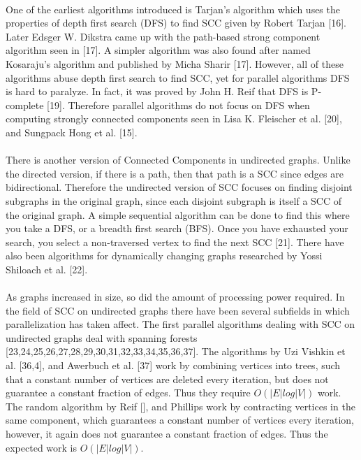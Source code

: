 \documentclass[]{article}
\begin{document}
 
 
 \paragraph{}
 One of the earliest algorithms introduced is Tarjan's algorithm which uses the properties of depth first search (DFS) to find SCC given by Robert Tarjan [16]. Later  Edsger W. Dikstra came up with the path-based strong component algorithm seen in [17]. A simpler algorithm was also found after named Kosaraju's algorithm and published by Micha Sharir [17]. However, all of these algorithms abuse depth first search to find SCC, yet for parallel algorithms DFS is hard to paralyze. In fact, it was proved by John H. Reif that DFS is P-complete [19]. Therefore parallel algorithms do not focus on DFS when computing strongly connected components seen in Lisa K. Fleischer et al. [20], and Sungpack Hong et al. [15].
 
 \paragraph{}
 There is another version of Connected Components in undirected graphs. Unlike the directed version, if there is a path, then that path is a SCC since edges are bidirectional. Therefore the undirected version of SCC focuses on finding disjoint subgraphs in the original graph, since each disjoint subgraph is itself a SCC of the original graph. A simple sequential algorithm can be done to find this where you take a DFS, or a breadth first search (BFS). Once you have exhausted your search, you select a non-traversed vertex to find the next SCC [21]. There have also been algorithms for dynamically changing graphs researched by Yossi Shiloach et al. [22].
 
 \paragraph{}
 As graphs increased in size, so did the amount of processing power required. In the field of SCC on undirected graphs there have been several subfields in which parallelization has taken affect.  The first parallel algorithms dealing with SCC on undirected graphs deal with spanning forests [23,24,25,26,27,28,29,30,31,32,33,34,35,36,37]. The algorithms by Uzi Vishkin et al. [36,4], and Awerbuch et al. [37] work by combining vertices into trees, such that a constant number of vertices are deleted every iteration, but does not guarantee a constant fraction of edges. Thus they require $O(|E| log |V|)$ work. The random algorithm by Reif [], and Phillips work by contracting vertices in the same component, which guarantees a constant number of vertices every iteration, however, it again does not guarantee a constant fraction of edges. Thus the expected work is $O(|E| log |V|)$.
 
\end{document}
